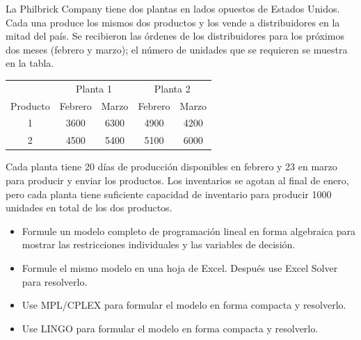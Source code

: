 \begin{Ejer} La Philbrick Company tiene dos plantas en lados opuestos de Estados Unidos. Cada una produce los mismos dos productos y los vende a distribuidores en la mitad del pa\'is. Se recibieron las \'ordenes de los distribuidores para los pr\'oximos dos meses (febrero y marzo); el n\'umero de unidades que se requieren se muestra en la tabla.

\begin{center}
\begin{tabular}{c|cc|cc}
\hline
 & \multicolumn{2}{c|}{Planta 1} & \multicolumn{2}{c}{Planta 2} \\
Producto & Febrero & Marzo & Febrero & Marzo \\
\hline
1 & 3600 & 6300 & 4900 & 4200 \\
2 & 4500 & 5400 & 5100 & 6000 \\
\hline
\end{tabular}
\end{center}

Cada planta tiene 20 d\'ias de producci\'on disponibles en febrero y 23 en marzo para producir y enviar los productos. Los inventarios se agotan al final de enero, pero cada planta tiene suficiente capacidad de inventario para producir 1000 unidades en total de los dos productos.

\begin{itemize}
\item[a)] Formule un modelo completo de programaci\'on lineal en forma algebraica para mostrar las restricciones individuales y las variables de decisi\'on.
\item[b)] Formule el mismo modelo en una hoja de Excel. Despu\'es use Excel Solver para resolverlo.
\item[c)] Use MPL/CPLEX para formular el modelo en forma compacta y resolverlo.
\item[d)] Use LINGO para formular el modelo en forma compacta y resolverlo.
\end{itemize}


\end{Ejer}


